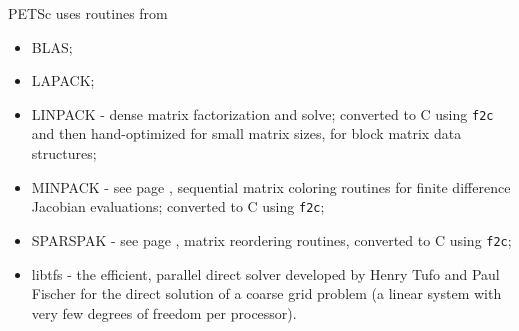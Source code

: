 \vspace{.3in}
\noindent
PETSc uses routines from 
\begin{itemize}
  \item BLAS;
  \item LAPACK;
  \item LINPACK -    dense matrix factorization and solve; converted to C using {\tt f2c} and then 
                     hand-optimized for small matrix sizes, for block matrix data structures;
  \item MINPACK -    see page \pageref{sec_fdmatrix}, sequential matrix coloring routines for finite difference Jacobian
                     evaluations; converted to C using {\tt f2c};
  \item SPARSPAK -   see page \pageref{sec_factorization}, matrix reordering routines, converted to C using {\tt f2c};
  \item libtfs     - the efficient, parallel direct solver developed by Henry Tufo and Paul Fischer for the direct solution of a coarse grid problem (a linear system with very few degrees of freedom per processor).
\end{itemize}


